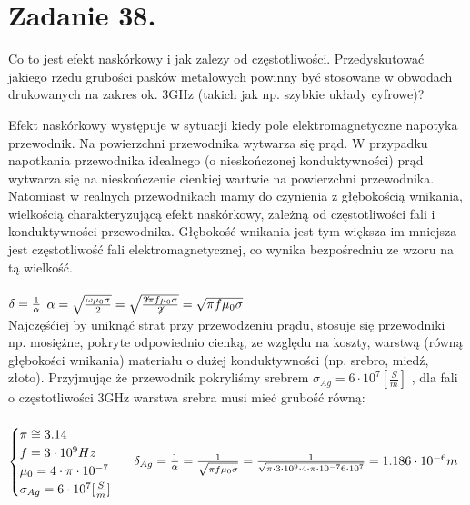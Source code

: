 \section*{Zadanie 38.}
\begin{task}
Co to jest efekt naskórkowy i jak zalezy od częstotliwości. Przedyskutować jakiego rzedu grubości pasków metalowych powinny być stosowane w obwodach drukowanych na zakres ok. 3GHz (takich jak np. szybkie układy cyfrowe)?\\
\end{task}



\begin{solution}
Efekt naskórkowy występuje w sytuacji kiedy pole elektromagnetyczne napotyka przewodnik. Na powierzchni przewodnika wytwarza się prąd. W przypadku napotkania przewodnika idealnego (o nieskończonej konduktywności) prąd wytwarza się na nieskończenie cienkiej wartwie na powierzchni przewodnika. Natomiast w realnych przewodnikach mamy do czynienia z głębokością wnikania, wielkością charakteryzującą efekt naskórkowy, zależną od częstotliwości fali i konduktywności przewodnika.
Głębokość wnikania jest tym większa im mniejsza jest częstotliwość fali elektromagnetycznej, co wynika bezpośredniu ze wzoru na tą wielkość.\\
\\
 $\delta = \frac{1}{ \alpha } \\$
 $\alpha  =  \sqrt{\frac{ \omega    \mu _{0}  \sigma  }{2}} = \sqrt{\frac{ \not{2} \pi f    \mu _{0}  \sigma  }{\not{2}}} = \sqrt {\pi f    \mu _{0}  \sigma}\\$
\\
Najczęśćiej by uniknąć strat przy przewodzeniu prądu, stosuje się przewodniki np. mosiężne, pokryte odpowiednio cienką, ze względu na koszty, warstwą (równą głębokości wnikania) materiału o dużej konduktywności (np. srebro, miedź, złoto).
Przyjmując że przewodnik pokryliśmy srebrem $\sigma_{Ag} = 6 \cdot 10^7 [\frac{S}{m}]$ , dla fali o częstotliwości 3GHz warstwa srebra musi mieć grubość równą: \\
\\
 $\begin{cases} \pi \cong 3.14\\f =3\cdot 10^9 Hz \\\mu _{0} = 4 \cdot \pi \cdot 10^{-7}\\ \sigma_{Ag} = 6 \cdot 10^7 [\frac{S}{m}] \end{cases} \\ \\$
 $\delta_{Ag} = \frac{1}{ \alpha } = \frac{1}{\sqrt {\pi f    \mu _{0}  \sigma}} = \frac{1}{\sqrt {\pi \cdot 3\cdot 10^9 \cdot 4 \cdot \pi \cdot 10^{-7} 6 \cdot 10^7}} = 1.186 \cdot 10^{-6} m \\$

\end{solution}